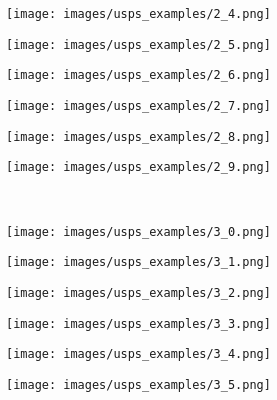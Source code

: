 \begin{figure}[t]
\begin{subfigure}[c]{0.07\textwidth}
 \end{subfigure}
 \begin{subfigure}[c]{0.07\textwidth}
  \centering
  \texttt{[image: images/usps\_examples/2\_4.png]}
 \end{subfigure}
 \begin{subfigure}[c]{0.07\textwidth}
  \centering
  \texttt{[image: images/usps\_examples/2\_5.png]}
 \end{subfigure}
 \begin{subfigure}[c]{0.07\textwidth}
  \centering
  \texttt{[image: images/usps\_examples/2\_6.png]}
 \end{subfigure}
 \begin{subfigure}[c]{0.07\textwidth}
  \centering
  \texttt{[image: images/usps\_examples/2\_7.png]}
 \end{subfigure}
 \begin{subfigure}[c]{0.07\textwidth}
  \centering
  \texttt{[image: images/usps\_examples/2\_8.png]}
 \end{subfigure}
 \begin{subfigure}[c]{0.07\textwidth}
  \centering
  \texttt{[image: images/usps\_examples/2\_9.png]}
 \end{subfigure}
 \\
 \begin{subfigure}[c]{0.07\textwidth}
  \centering
  \texttt{[image: images/usps\_examples/3\_0.png]}
 \end{subfigure}
 \begin{subfigure}[c]{0.07\textwidth}
  \centering
  \texttt{[image: images/usps\_examples/3\_1.png]}
 \end{subfigure}
 \begin{subfigure}[c]{0.07\textwidth}
  \centering
  \texttt{[image: images/usps\_examples/3\_2.png]}
 \end{subfigure}
 \begin{subfigure}[c]{0.07\textwidth}
  \centering
  \texttt{[image: images/usps\_examples/3\_3.png]}
 \end{subfigure}
 \begin{subfigure}[c]{0.07\textwidth}
  \centering
  \texttt{[image: images/usps\_examples/3\_4.png]}
 \end{subfigure}
 \begin{subfigure}[c]{0.07\textwidth}
  \centering
  \texttt{[image: images/usps\_examples/3\_5.png]}

\end{subfigure}
\end{figure}
